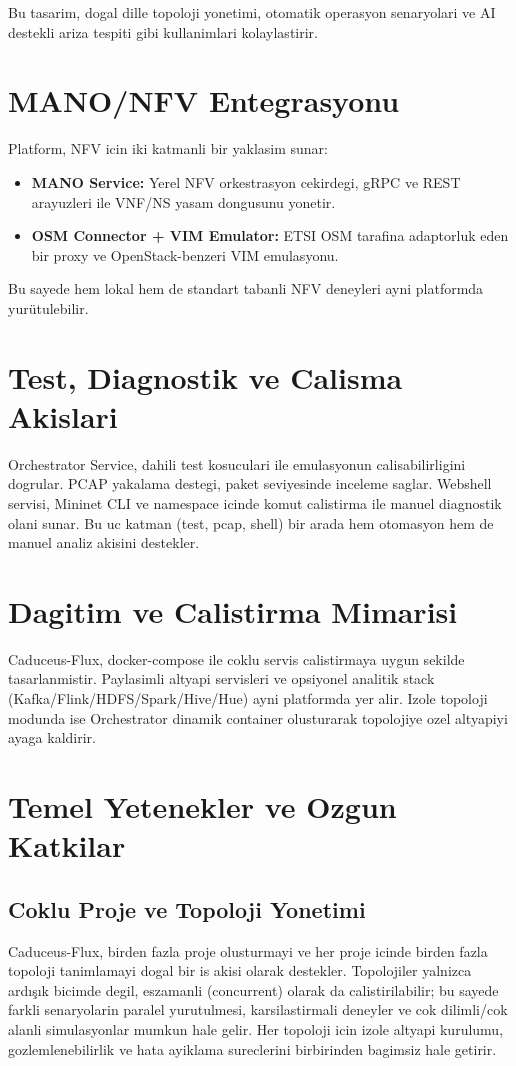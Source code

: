 \documentclass[conference]{IEEEtran}
\begin{document}
Bu tasarim, dogal dille topoloji yonetimi, otomatik operasyon senaryolari ve AI destekli ariza tespiti gibi kullanimlari kolaylastirir.

\section{MANO/NFV Entegrasyonu}
Platform, NFV icin iki katmanli bir yaklasim sunar:
\begin{itemize}
\item \textbf{MANO Service:} Yerel NFV orkestrasyon cekirdegi, gRPC ve REST arayuzleri ile VNF/NS yasam dongusunu yonetir.
\item \textbf{OSM Connector + VIM Emulator:} ETSI OSM tarafina adaptorluk eden bir proxy ve OpenStack-benzeri VIM emulasyonu.
\end{itemize}

Bu sayede hem lokal hem de standart tabanli NFV deneyleri ayni platformda yurütulebilir.

\section{Test, Diagnostik ve Calisma Akislari}
Orchestrator Service, dahili test kosuculari ile emulasyonun calisabilirligini dogrular. PCAP yakalama destegi, paket seviyesinde inceleme saglar. Webshell servisi, Mininet CLI ve namespace icinde komut calistirma ile manuel diagnostik olani sunar. Bu uc katman (test, pcap, shell) bir arada hem otomasyon hem de manuel analiz akisini destekler.

\section{Dagitim ve Calistirma Mimarisi}
Caduceus-Flux, docker-compose ile coklu servis calistirmaya uygun sekilde tasarlanmistir. Paylasimli altyapi servisleri ve opsiyonel analitik stack (Kafka/Flink/HDFS/Spark/Hive/Hue) ayni platformda yer alir. Izole topoloji modunda ise Orchestrator dinamik container olusturarak topolojiye ozel altyapiyi ayaga kaldirir.

\section{Temel Yetenekler ve Ozgun Katkilar}

\subsection{Coklu Proje ve Topoloji Yonetimi}
Caduceus-Flux, birden fazla proje olusturmayi ve her proje icinde birden fazla topoloji tanimlamayi dogal bir is akisi olarak destekler. Topolojiler yalnizca ardışık bicimde degil, eszamanli (concurrent) olarak da calistirilabilir; bu sayede farkli senaryolarin paralel yurutulmesi, karsilastirmali deneyler ve cok dilimli/cok alanli simulasyonlar mumkun hale gelir. Her topoloji icin izole altyapi kurulumu, gozlemlenebilirlik ve hata ayiklama sureclerini birbirinden bagimsiz hale getirir.
\end{document}
